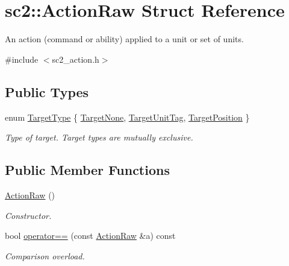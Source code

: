 \hypertarget{structsc2_1_1_action_raw}{}\section{sc2\+:\+:Action\+Raw Struct Reference}
\label{structsc2_1_1_action_raw}


An action (command or ability) applied to a unit or set of units.  




{\ttfamily \#include $<$sc2\+\_\+action.\+h$>$}

\subsection*{Public Types}
\begin{DoxyCompactItemize}
\item 
enum \hyperlink{structsc2_1_1_action_raw_a18505ce7c00e382d636339eba391d800}{Target\+Type} \{ \hyperlink{structsc2_1_1_action_raw_a18505ce7c00e382d636339eba391d800ad76dbb1f34ebecacde71ea8d7b573a01}{Target\+None}, 
\hyperlink{structsc2_1_1_action_raw_a18505ce7c00e382d636339eba391d800a61c42ac7737f36c0c9ee4be66feb1933}{Target\+Unit\+Tag}, 
\hyperlink{structsc2_1_1_action_raw_a18505ce7c00e382d636339eba391d800af9e15c024c14d7dd4570395858a9882a}{Target\+Position}
 \}\begin{DoxyCompactList}\small\item\em Type of target. Target types are mutually exclusive. \end{DoxyCompactList}
\end{DoxyCompactItemize}
\subsection*{Public Member Functions}
\begin{DoxyCompactItemize}
\item 
\mbox{\label{structsc2_1_1_action_raw_a88b07cbf99a78d573969b0c14410ab88}} 
\hyperlink{structsc2_1_1_action_raw_a88b07cbf99a78d573969b0c14410ab88}{Action\+Raw} ()
\begin{DoxyCompactList}\small\item\em Constructor. \end{DoxyCompactList}\item 
\mbox{\label{structsc2_1_1_action_raw_a9cf9e83ec9ebd6f9db4520ede7150aed}} 
bool \hyperlink{structsc2_1_1_action_raw_a9cf9e83ec9ebd6f9db4520ede7150aed}{operator==} (const \hyperlink{structsc2_1_1_action_raw}{Action\+Raw} \&a) const
\begin{DoxyCompactList}\small\item\em Comparison overload. \end{DoxyCompactList}\end{DoxyCompactItemize}
